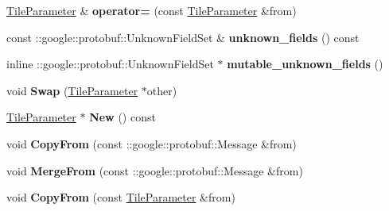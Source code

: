 \begin{DoxyCompactItemize}
\item 
\mbox{\label{classcaffe_1_1_tile_parameter_a8bcfb84992402cdf1a9abd2addfb4fd5}} 
\mbox{\hyperlink{classcaffe_1_1_tile_parameter}{Tile\+Parameter}} \& {\bfseries operator=} (const \mbox{\hyperlink{classcaffe_1_1_tile_parameter}{Tile\+Parameter}} \&from)
\item 
\mbox{\label{classcaffe_1_1_tile_parameter_a7214ceb45faafdc8e113625dbcf36ddc}} 
const \+::google\+::protobuf\+::\+Unknown\+Field\+Set \& {\bfseries unknown\+\_\+fields} () const
\item 
\mbox{\label{classcaffe_1_1_tile_parameter_a5a0131d0c7f0a7c11b10a6f3734d963c}} 
inline \+::google\+::protobuf\+::\+Unknown\+Field\+Set $\ast$ {\bfseries mutable\+\_\+unknown\+\_\+fields} ()
\item 
\mbox{\label{classcaffe_1_1_tile_parameter_a163d1acbf76761bce7fede52faa67b02}} 
void {\bfseries Swap} (\mbox{\hyperlink{classcaffe_1_1_tile_parameter}{Tile\+Parameter}} $\ast$other)
\item 
\mbox{\label{classcaffe_1_1_tile_parameter_aef68233cc5935c390c8059a296f7a028}} 
\mbox{\hyperlink{classcaffe_1_1_tile_parameter}{Tile\+Parameter}} $\ast$ {\bfseries New} () const
\item 
\mbox{\label{classcaffe_1_1_tile_parameter_a53205984a7ea267e53589d2fb0fe0abf}} 
void {\bfseries Copy\+From} (const \+::google\+::protobuf\+::\+Message \&from)
\item 
\mbox{\label{classcaffe_1_1_tile_parameter_a7b88bddc4dda1ec81cb6d865f6fc848a}} 
void {\bfseries Merge\+From} (const \+::google\+::protobuf\+::\+Message \&from)
\item 
\mbox{\label{classcaffe_1_1_tile_parameter_af27dfd797341f31b2bee5f7fc8c348e7}} 
void {\bfseries Copy\+From} (const \mbox{\hyperlink{classcaffe_1_1_tile_parameter}{Tile\+Parameter}} \&from)
\item 
\mbox{\label{classcaffe_1_1_tile_parameter_aacbaec7650bb01c7d0d59372523c1df3}} 

\end{DoxyCompactItemize}
